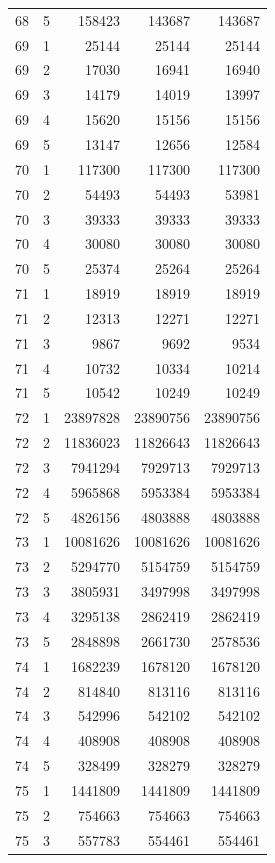 \begin{longtable}{rrrrr}
68 & 5 & 158423 & 143687 & 143687 \\
69 & 1 & 25144 & 25144 & 25144 \\
69 & 2 & 17030 & 16941 & 16940 \\
69 & 3 & 14179 & 14019 & 13997 \\
69 & 4 & 15620 & 15156 & 15156 \\
69 & 5 & 13147 & 12656 & 12584 \\
70 & 1 & 117300 & 117300 & 117300 \\
70 & 2 & 54493 & 54493 & 53981 \\
70 & 3 & 39333 & 39333 & 39333 \\
70 & 4 & 30080 & 30080 & 30080 \\
70 & 5 & 25374 & 25264 & 25264 \\
71 & 1 & 18919 & 18919 & 18919 \\
71 & 2 & 12313 & 12271 & 12271 \\
71 & 3 & 9867 & 9692 & 9534 \\
71 & 4 & 10732 & 10334 & 10214 \\
71 & 5 & 10542 & 10249 & 10249 \\
72 & 1 & 23897828 & 23890756 & 23890756 \\
72 & 2 & 11836023 & 11826643 & 11826643 \\
72 & 3 & 7941294 & 7929713 & 7929713 \\
72 & 4 & 5965868 & 5953384 & 5953384 \\
72 & 5 & 4826156 & 4803888 & 4803888 \\
73 & 1 & 10081626 & 10081626 & 10081626 \\
73 & 2 & 5294770 & 5154759 & 5154759 \\
73 & 3 & 3805931 & 3497998 & 3497998 \\
73 & 4 & 3295138 & 2862419 & 2862419 \\
73 & 5 & 2848898 & 2661730 & 2578536 \\
74 & 1 & 1682239 & 1678120 & 1678120 \\
74 & 2 & 814840 & 813116 & 813116 \\
74 & 3 & 542996 & 542102 & 542102 \\
74 & 4 & 408908 & 408908 & 408908 \\
74 & 5 & 328499 & 328279 & 328279 \\
75 & 1 & 1441809 & 1441809 & 1441809 \\
75 & 2 & 754663 & 754663 & 754663 \\
75 & 3 & 557783 & 554461 & 554461 \\

\end{longtable}
